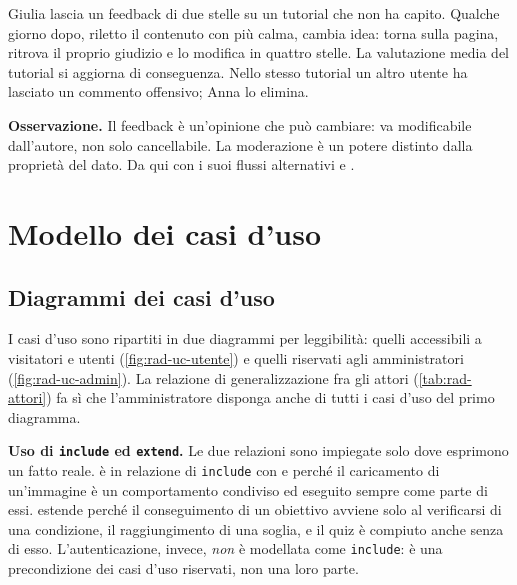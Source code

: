 Giulia lascia un feedback di due stelle su un tutorial che non ha capito.
Qualche giorno dopo, riletto il contenuto con più calma, cambia idea: torna
sulla pagina, ritrova il proprio giudizio e lo modifica in quattro stelle. La
valutazione media del tutorial si aggiorna di conseguenza. Nello stesso
tutorial un altro utente ha lasciato un commento offensivo; Anna lo elimina.

\textbf{Osservazione.} Il feedback è un'opinione che può cambiare: va
modificabile dall'autore, non solo cancellabile. La moderazione è un potere
distinto dalla proprietà del dato. Da qui  con i suoi flussi
alternativi e .

\section{Modello dei casi d'uso}
\label{sec:rad-uc}

\subsection{Diagrammi dei casi d'uso}

I casi d'uso sono ripartiti in due diagrammi per leggibilità: quelli
accessibili a visitatori e utenti (\cref{fig:rad-uc-utente}) e quelli
riservati agli amministratori (\cref{fig:rad-uc-admin}). La relazione di
generalizzazione fra gli attori (\cref{tab:rad-attori}) fa sì che
l'amministratore disponga anche di tutti i casi d'uso del primo diagramma.



\begin{nota}
\textbf{Uso di \texttt{include} ed \texttt{extend}.} Le due relazioni sono
impiegate solo dove esprimono un fatto reale.
 è in relazione di \texttt{include} con  e 
perché il caricamento di un'immagine è un comportamento condiviso ed
eseguito sempre come parte di essi.
 estende  perché il conseguimento di un obiettivo
avviene solo al verificarsi di una condizione, il raggiungimento di una
soglia, e il quiz è compiuto anche senza di esso.
L'autenticazione, invece, \emph{non} è modellata come \texttt{include}: è una
precondizione dei casi d'uso riservati, non una loro parte.
\end{nota}

